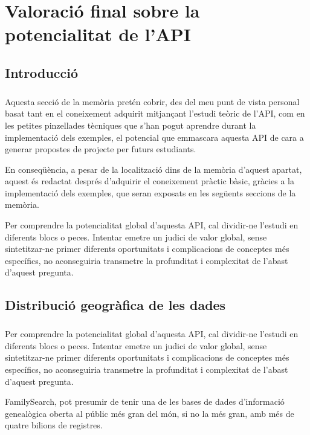\chapter{Valoració final sobre la potencialitat de l'API}

\section{Introducció}

    \paragraph{}
    Aquesta secció de la memòria pretén cobrir, des del meu punt de vista personal basat tant en el coneixement adquirit mitjançant l'estudi teòric de l'API, com en les petites pinzellades tècniques que s'han pogut aprendre durant la implementació dels exemples, el potencial que emmascara aquesta API de cara a generar propostes de projecte per futurs estudiants.

    En conseqüència, a pesar de la localització dins de la memòria d'aquest apartat, aquest és redactat després d'adquirir el coneixement pràctic bàsic, gràcies a la implementació dels exemples, que seran exposats en les següents seccions de la memòria.

    Per comprendre la potencialitat global d'aquesta API, cal dividir-ne l'estudi en diferents blocs o peces. Intentar emetre un judici de valor global, sense sintetitzar-ne primer diferents oportunitats i complicacions de conceptes més específics, no aconseguiria transmetre la profunditat i complexitat de l'abast d'aquest pregunta.

\section{Distribució geogràfica de les dades}

    \paragraph{}
    Per comprendre la potencialitat global d'aquesta API, cal dividir-ne l'estudi en diferents blocs o peces. Intentar emetre un judici de valor global, sense sintetitzar-ne primer diferents oportunitats i complicacions de conceptes més específics, no aconseguiria transmetre la profunditat i complexitat de l'abast d'aquest pregunta.

    FamilySearch, pot presumir de tenir una de les bases de dades d'informació genealògica oberta al públic més gran del món, si no la més gran, amb més de quatre bilions de registres.

